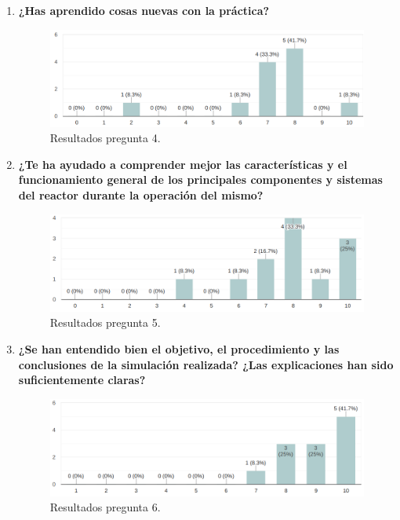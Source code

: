 \begin{enumerate}
    \item \textbf{¿Has aprendido cosas nuevas con la práctica?}
    \newline
    \begin{figure}[h]
        \centering
        \vspace{-0.5cm}
        \includegraphics[width=\textwidth]{content/figures/encuesta_4.png}
        \caption{Resultados pregunta 4.}
        \label{fig:encuesta_4}
    \end{figure}
    
    \item \textbf{¿Te ha ayudado a comprender mejor las características y el funcionamiento general de los principales componentes y sistemas del reactor durante la operación del mismo?}
    
    \begin{figure}[h]
        \centering
        \includegraphics[width=\textwidth]{content/figures/encuesta_5.png}
        \caption{Resultados pregunta 5.}
        \label{fig:encuesta_5}
    \end{figure}
    
    \item \textbf{¿Se han entendido bien el objetivo, el procedimiento y las conclusiones de la simulación realizada? ¿Las explicaciones han sido suficientemente claras?}
    
    \begin{figure}[!h]
        \centering
        \includegraphics[width=\textwidth]{content/figures/encuesta_6.png}
        \caption{Resultados pregunta 6.}
        \label{fig:encuesta_6}
    \end{figure}
    

\end{enumerate}
